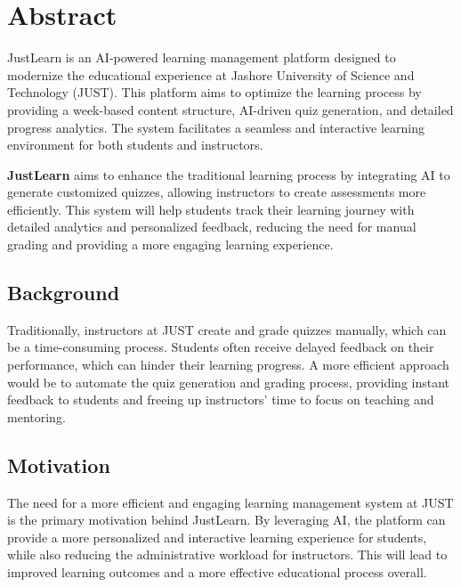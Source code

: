 \documentclass{thesis-library}
\begin{document}
\newpage
\tableofcontents
\newpage

\chapter*{Abstract}
JustLearn is an AI-powered learning management platform designed to modernize the educational experience at Jashore University of Science and Technology (JUST). This platform aims to optimize the learning process by providing a week-based content structure, AI-driven quiz generation, and detailed progress analytics. The system facilitates a seamless and interactive learning environment for both students and instructors.

\newpage
{}

\newpage
\textbf{JustLearn} aims to enhance the traditional learning process by integrating AI to generate customized quizzes, allowing instructors to create assessments more efficiently. This system will help students track their learning journey with detailed analytics and personalized feedback, reducing the need for manual grading and providing a more engaging learning experience.

\section{Background}
Traditionally, instructors at JUST create and grade quizzes manually, which can be a time-consuming process. Students often receive delayed feedback on their performance, which can hinder their learning progress. A more efficient approach would be to automate the quiz generation and grading process, providing instant feedback to students and freeing up instructors' time to focus on teaching and mentoring.

\section{Motivation}
The need for a more efficient and engaging learning management system at JUST is the primary motivation behind JustLearn. By leveraging AI, the platform can provide a more personalized and interactive learning experience for students, while also reducing the administrative workload for instructors. This will lead to improved learning outcomes and a more effective educational process overall.
\end{document}
